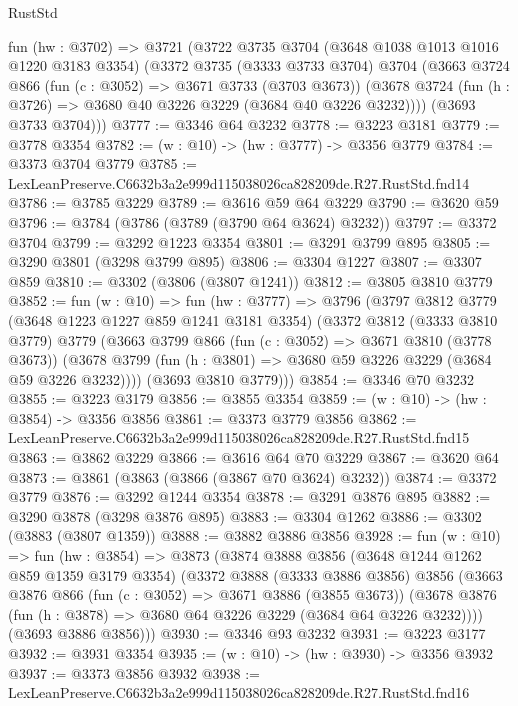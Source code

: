 \begin{lexlean}{RustStd}
\begin{coremodule}
  fun (hw : @3702) =>
  @3721
    (@3722
      @3735
      @3704
      (@3648 @1038 @1013 @1016 @1220 @3183 @3354)
      (@3372
        @3735
        (@3333 @3733 @3704)
        @3704
        (@3663
          @3724
          @866
          (fun (c : @3052) => @3671 @3733 (@3703 @3673))
          (@3678 @3724 (fun (h : @3726) => @3680 @40 @3226 @3229 (@3684 @40 @3226 @3232))))
        (@3693 @3733 @3704)))
@3777 := @3346 @64 @3232
@3778 := @3223 @3181
@3779 := @3778 @3354
@3782 := (w : @10) -> (hw : @3777) -> @3356 @3779
@3784 := @3373 @3704 @3779
@3785 := LexLeanPreserve.C6632b3a2e999d115038026ca828209de.R27.RustStd.fnd14
@3786 := @3785 @3229
@3789 := @3616 @59 @64 @3229
@3790 := @3620 @59
@3796 := @3784 (@3786 (@3789 (@3790 @64 @3624) @3232))
@3797 := @3372 @3704
@3799 := @3292 @1223 @3354
@3801 := @3291 @3799 @895
@3805 := @3290 @3801 (@3298 @3799 @895)
@3806 := @3304 @1227
@3807 := @3307 @859
@3810 := @3302 (@3806 (@3807 @1241))
@3812 := @3805 @3810 @3779
@3852 := fun (w : @10) =>
  fun (hw : @3777) =>
  @3796
    (@3797
      @3812
      @3779
      (@3648 @1223 @1227 @859 @1241 @3181 @3354)
      (@3372
        @3812
        (@3333 @3810 @3779)
        @3779
        (@3663
          @3799
          @866
          (fun (c : @3052) => @3671 @3810 (@3778 @3673))
          (@3678 @3799 (fun (h : @3801) => @3680 @59 @3226 @3229 (@3684 @59 @3226 @3232))))
        (@3693 @3810 @3779)))
@3854 := @3346 @70 @3232
@3855 := @3223 @3179
@3856 := @3855 @3354
@3859 := (w : @10) -> (hw : @3854) -> @3356 @3856
@3861 := @3373 @3779 @3856
@3862 := LexLeanPreserve.C6632b3a2e999d115038026ca828209de.R27.RustStd.fnd15
@3863 := @3862 @3229
@3866 := @3616 @64 @70 @3229
@3867 := @3620 @64
@3873 := @3861 (@3863 (@3866 (@3867 @70 @3624) @3232))
@3874 := @3372 @3779
@3876 := @3292 @1244 @3354
@3878 := @3291 @3876 @895
@3882 := @3290 @3878 (@3298 @3876 @895)
@3883 := @3304 @1262
@3886 := @3302 (@3883 (@3807 @1359))
@3888 := @3882 @3886 @3856
@3928 := fun (w : @10) =>
  fun (hw : @3854) =>
  @3873
    (@3874
      @3888
      @3856
      (@3648 @1244 @1262 @859 @1359 @3179 @3354)
      (@3372
        @3888
        (@3333 @3886 @3856)
        @3856
        (@3663
          @3876
          @866
          (fun (c : @3052) => @3671 @3886 (@3855 @3673))
          (@3678 @3876 (fun (h : @3878) => @3680 @64 @3226 @3229 (@3684 @64 @3226 @3232))))
        (@3693 @3886 @3856)))
@3930 := @3346 @93 @3232
@3931 := @3223 @3177
@3932 := @3931 @3354
@3935 := (w : @10) -> (hw : @3930) -> @3356 @3932
@3937 := @3373 @3856 @3932
@3938 := LexLeanPreserve.C6632b3a2e999d115038026ca828209de.R27.RustStd.fnd16

\end{coremodule}
\end{lexlean}
